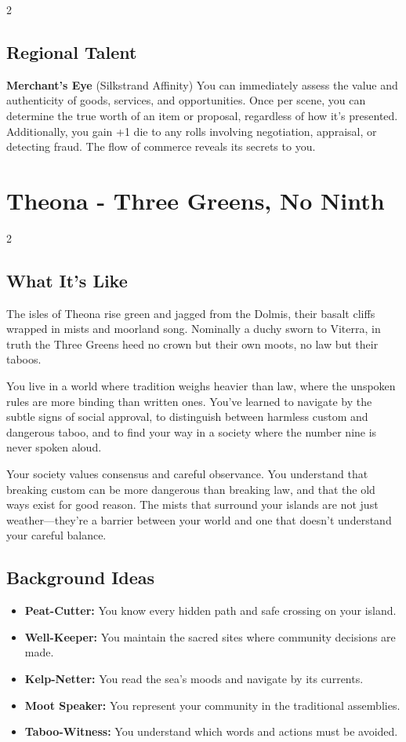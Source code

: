 \documentclass[11pt]{article}
\newcommand{\region}[1]{\section*{#1}}
\newcommand{\subregion}[1]{\subsection*{#1}}
\begin{document}
\begin{multicols}{2}
\subregion{Regional Talent}

\textbf{Merchant's Eye} (Silkstrand Affinity)
You can immediately assess the value and authenticity of goods, services, and opportunities. Once per scene, you can determine the true worth of an item or proposal, regardless of how it's presented. Additionally, you gain +1 die to any rolls involving negotiation, appraisal, or detecting fraud. The flow of commerce reveals its secrets to you.

\end{multicols}

\region{Theona - Three Greens, No Ninth}

\begin{multicols}{2}
\subregion{What It's Like}

The isles of Theona rise green and jagged from the Dolmis, their basalt cliffs wrapped in mists and moorland song. Nominally a duchy sworn to Viterra, in truth the Three Greens heed no crown but their own moots, no law but their taboos.

You live in a world where tradition weighs heavier than law, where the unspoken rules are more binding than written ones. You've learned to navigate by the subtle signs of social approval, to distinguish between harmless custom and dangerous taboo, and to find your way in a society where the number nine is never spoken aloud.

Your society values consensus and careful observance. You understand that breaking custom can be more dangerous than breaking law, and that the old ways exist for good reason. The mists that surround your islands are not just weather---they're a barrier between your world and one that doesn't understand your careful balance.

\columnbreak

\subregion{Background Ideas}

\begin{itemize}[leftmargin=*]
    \item \textbf{Peat-Cutter:} You know every hidden path and safe crossing on your island.
    \item \textbf{Well-Keeper:} You maintain the sacred sites where community decisions are made.
    \item \textbf{Kelp-Netter:} You read the sea's moods and navigate by its currents.
    \item \textbf{Moot Speaker:} You represent your community in the traditional assemblies.
    \item \textbf{Taboo-Witness:} You understand which words and actions must be avoided.
\end{itemize}


\end{multicols}
\end{document}
